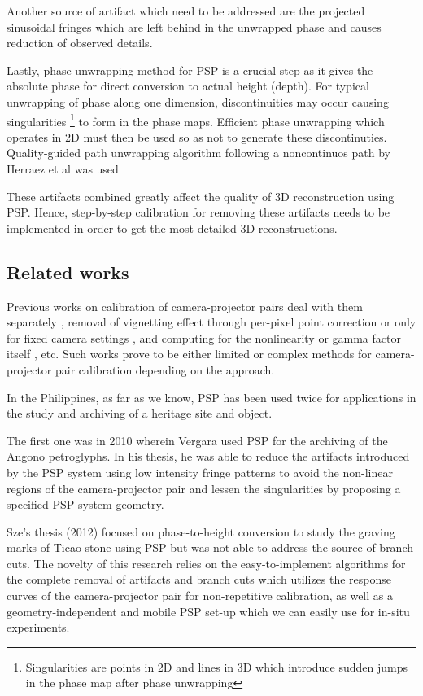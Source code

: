 Another source of artifact which need to be addressed are the projected sinusoidal fringes which are left behind in the unwrapped phase and causes reduction of observed details.

Lastly, phase unwrapping method for PSP is a crucial step as it gives the absolute phase for direct conversion to actual height (depth). For typical unwrapping of phase along one dimension, discontinuities may occur causing singularities \footnote{Singularities are points in 2D and lines in 3D which introduce sudden jumps in the phase map after phase unwrapping} to form in the phase maps.
Efficient phase unwrapping which operates in 2D must then be used so as not to generate these discontinuties. Quality-guided path unwrapping algorithm following a noncontinuos path by Herraez et al was used 

These artifacts combined greatly affect the quality of 3D reconstruction using PSP.
Hence, step-by-step calibration for removing these artifacts needs to be implemented in order to get the most detailed 3D reconstructions. 

\subsection{Related works}

Previous works on calibration of camera-projector pairs deal with them separately \cite{Fernandez2011}, removal of vignetting effect through per-pixel point correction\cite{Yu2004} or only for fixed camera settings \cite{Goldman}, and computing for the nonlinearity or gamma factor itself \cite{Wang2014, Baker2008}, etc. 
Such works prove to be either limited or complex methods for camera-projector pair calibration depending on the approach.

In the Philippines, as far as we know, PSP has been used twice for applications in the study and archiving of a heritage site and object. 

The first one was in 2010 wherein Vergara used PSP for the archiving of the Angono petroglyphs. 
In his thesis, he was able to reduce the artifacts introduced by the PSP system using low intensity fringe patterns to avoid the non-linear regions of the camera-projector pair and lessen the singularities by proposing a specified PSP system geometry. 

Sze’s thesis (2012) focused on phase-to-height conversion to study the graving marks of Ticao stone using PSP but was not able to address the source of branch cuts. The novelty of this research relies on the easy-to-implement algorithms for the complete removal of artifacts and branch cuts which utilizes the response curves of the camera-projector pair for non-repetitive calibration, as well as a geometry-independent and mobile PSP set-up which we can easily use for in-situ experiments.

